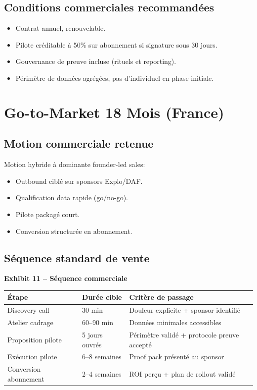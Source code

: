 \documentclass[11pt,a4paper]{article}
\newcommand{\exhibit}[1]{\vspace{2mm}\noindent\colorbox{PraedixaLight}{\parbox{\dimexpr\linewidth-2\fboxsep\relax}{\textbf{#1}}}\vspace{1mm}}
\begin{document}
\subsection{Conditions commerciales recommandées}
\begin{itemize}
  \item Contrat annuel, renouvelable.
  \item Pilote créditable à 50\% sur abonnement si signature sous 30 jours.
  \item Gouvernance de preuve incluse (rituels et reporting).
  \item Périmètre de données agrégées, pas d'individuel en phase initiale.
\end{itemize}

\section{Go-to-Market 18 Mois (France)}
\subsection{Motion commerciale retenue}
Motion hybride à dominante founder-led sales:
\begin{itemize}
  \item Outbound ciblé sur sponsors Explo/DAF.
  \item Qualification data rapide (go/no-go).
  \item Pilote packagé court.
  \item Conversion structurée en abonnement.
\end{itemize}

\subsection{Séquence standard de vente}
\exhibit{Exhibit 11 -- Séquence commerciale}
\begin{tabularx}{\linewidth}{@{}l l X@{}}
\toprule
\textbf{Étape} & \textbf{Durée cible} & \textbf{Critère de passage} \\
\midrule
Discovery call & 30 min & Douleur explicite + sponsor identifié \\
Atelier cadrage & 60--90 min & Données minimales accessibles \\
Proposition pilote & 5 jours ouvrés & Périmètre validé + protocole preuve accepté \\
Exécution pilote & 6--8 semaines & Proof pack présenté au sponsor \\
Conversion abonnement & 2--4 semaines & ROI perçu + plan de rollout validé \\
\bottomrule
\end{tabularx}
\end{document}
